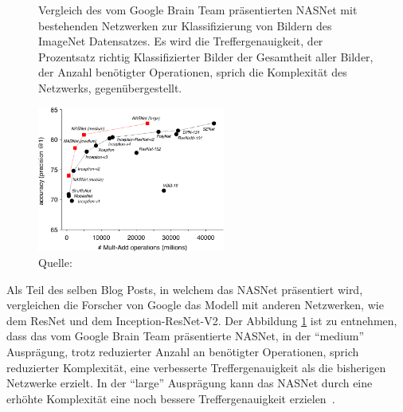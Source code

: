 \begin{figure} 
    \caption{Vergleich des vom Google Brain Team präsentierten NASNet mit bestehenden Netzwerken zur Klassifizierung von Bildern des ImageNet Datensatzes. Es wird die Treffergenauigkeit, der Prozentsatz richtig Klassifizierter Bilder der Gesamtheit aller Bilder, der Anzahl benötigter Operationen, sprich die Komplexität des Netzwerks, gegenübergestellt.}
    \label{nasnet-comparision}
    \centering
    \includegraphics[width=0.55\textwidth]{graphics/nasnet-comparision.jpg}
    \caption*{Quelle: \textcite{GoogleNasNet}}
\end{figure}
Als Teil des selben Blog Posts, in welchem das NASNet präsentiert wird, vergleichen die Forscher von Google das Modell mit anderen Netzwerken, wie dem ResNet und dem Inception-ResNet-V2. Der Abbildung \ref{nasnet-comparision} ist zu entnehmen, dass das vom Google Brain Team präsentierte NASNet, in der \enquote{medium} Ausprägung, trotz reduzierter Anzahl an benötigter Operationen, sprich reduzierter Komplexität, eine verbesserte Treffergenauigkeit als die bisherigen Netzwerke erzielt. In der \enquote{large} Ausprägung kann das NASNet durch eine erhöhte Komplexität eine noch bessere Treffergenauigkeit erzielen~\autocite{GoogleNasNet}.




